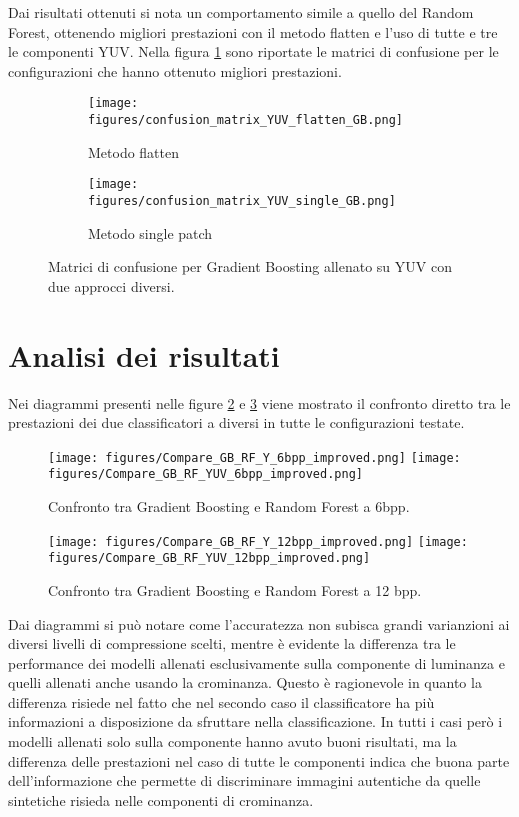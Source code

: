 Dai risultati ottenuti si nota un comportamento simile a quello del Random Forest, ottenendo migliori prestazioni con il metodo flatten e l'uso di tutte e tre le componenti YUV.
Nella figura \ref{fig:GB_YUV_confusion} sono riportate le matrici di confusione per le configurazioni che hanno ottenuto migliori prestazioni.
\begin{figure}[H]
    \centering
    \begin{subfigure}[b]{0.7\textwidth}
        \centering
        \texttt{[image: figures/confusion\_matrix\_YUV\_flatten\_GB.png]}
        \caption{Metodo flatten}
    \end{subfigure}
    \hfill
    \begin{subfigure}[b]{0.7\textwidth}
        \centering
        \texttt{[image: figures/confusion\_matrix\_YUV\_single\_GB.png]}
        \caption{Metodo single patch}
    \end{subfigure}
    \caption{Matrici di confusione per Gradient Boosting allenato su YUV con due approcci diversi.}
    \label{fig:GB_YUV_confusion}
\end{figure}
\section{Analisi dei risultati}
Nei diagrammi presenti nelle figure \ref{fig:GB_RF_Y_comparison} e \ref{fig:GB_RF_YUV_comparison} viene mostrato il confronto diretto tra le prestazioni dei due classificatori a diversi in tutte le configurazioni testate.
\begin{figure}
    \centering
    \texttt{[image: figures/Compare\_GB\_RF\_Y\_6bpp\_improved.png]}
    \texttt{[image: figures/Compare\_GB\_RF\_YUV\_6bpp\_improved.png]}
    \caption{Confronto tra Gradient Boosting e Random Forest a 6bpp.}
    \label{fig:GB_RF_Y_comparison}
\end{figure}

\begin{figure}
    \centering
    \texttt{[image: figures/Compare\_GB\_RF\_Y\_12bpp\_improved.png]}
    \texttt{[image: figures/Compare\_GB\_RF\_YUV\_12bpp\_improved.png]}
    \caption{Confronto tra Gradient Boosting e Random Forest a 12 bpp.}
    \label{fig:GB_RF_YUV_comparison}
\end{figure}
Dai diagrammi si può notare come l'accuratezza non subisca grandi varianzioni ai diversi livelli di compressione scelti, mentre è evidente la differenza tra le performance dei modelli allenati esclusivamente sulla componente di luminanza e quelli allenati anche usando la crominanza. Questo è ragionevole in quanto la differenza risiede nel fatto che nel secondo caso il classificatore ha più informazioni a disposizione da sfruttare nella classificazione. In tutti i casi però i modelli allenati solo sulla componente hanno avuto buoni risultati, ma la differenza delle prestazioni nel caso di tutte le componenti indica che buona parte dell'informazione che permette di discriminare immagini autentiche da quelle sintetiche risieda nelle componenti di crominanza.\\

